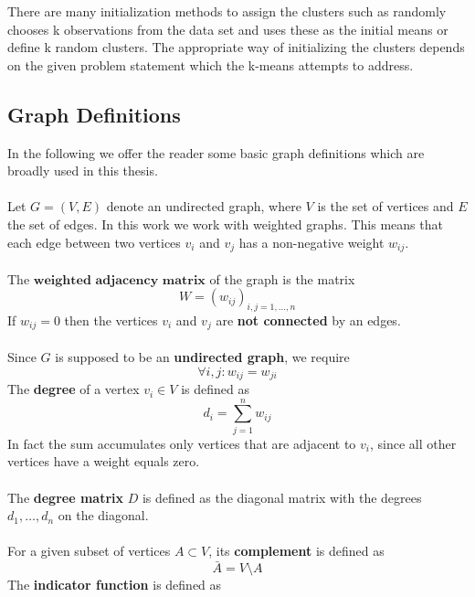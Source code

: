 There are many initialization methods to assign the clusters such as randomly chooses k observations from the data set and uses these as the initial means or define k random clusters. The appropriate way of initializing the clusters depends on the given problem statement which the k-means attempts to address. 

\subsection{Graph Definitions}
In the following we offer the reader some basic graph definitions which are broadly used in this thesis. \\ \\ 
Let $G = (V, E)$ denote an undirected graph, where $V$ is the set of vertices and $E$ the set of edges. In this work we work with weighted graphs. This means that each edge between two vertices $v_i$ and $v_j$ has a non-negative weight $w_{ij}$. \\ \\
The $\textbf{weighted adjacency matrix}$ of the graph is the matrix 
\begin{equation}
W = \left( w_{ij} \right)_{i,j=1,\dots, n}
\label{eq:def_adjacency_matrix}
\end{equation}
If $w_{ij} = 0$ then the vertices $v_i$ and $v_j$ are \textbf{not connected} by an edges. \\ \\
Since $G$ is supposed to be an \textbf{undirected graph}, we require
\begin{equation}
	\forall i,j : w_{ij} = w_{ji}
\end{equation}
The \textbf{degree} of a vertex $v_i \in V$ is defined as
\begin{equation}
	d_i = \sum_{j=1}^n w_{ij}
\label{eq:vertex_degree}
\end{equation}
In fact the sum accumulates only vertices that are adjacent to $v_i$, since all other vertices have a weight equals zero. \\ \\
The \textbf{degree matrix} $D$ is defined as the diagonal matrix with the degrees $d_1,\dots, d_n$ on the diagonal. \\ \\
For a given subset of vertices $A \subset V$, its \textbf{complement} is defined as
\begin{equation}
	\bar{A} = V \setminus A
\label{eq:set_complement}
\end{equation}
The \textbf{indicator function} is defined as
